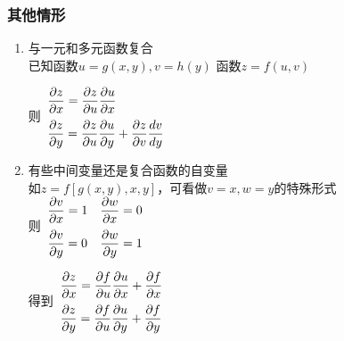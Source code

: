 \documentclass{article} %
\begin{document}
\subsubsection{其他情形}
\begin{enumerate}
    \item 与一元和多元函数复合\\已知函数$u=g(x,y),v=h(y)$ 函数$z=f(u,v)$\par
        \vspace{1mm}

        则$
        \begin{array}{ll}
            \displaystyle \frac{\partial z}{\partial x}=\frac{\partial z}{\partial u}\frac{\partial u}{\partial x} \vspace{2mm}\\
            \displaystyle \frac{\partial z}{\partial y}=\frac{\partial z}{\partial u}\frac{\partial u}{\partial y}+\frac{\partial z}{\partial v}\frac{d v}{d y}
        \end{array}$
    \item 有些中间变量还是复合函数的自变量\\
        如$z=f[g(x,y),x,y]$，可看做$v=x,w=y$的特殊形式\\
        则$\begin{array}{cc}
            \displaystyle\frac{\partial v}{\partial x}=1 & \displaystyle\frac{\partial w}{\partial x}=0 \vspace{2mm}\\
            \displaystyle\frac{\partial v}{\partial y}=0 & \displaystyle\frac{\partial w}{\partial y}=1\\
        \end{array}$\\
        \vspace{2mm}

        得到$\begin{array}{l}
            \displaystyle\frac{\partial z}{\partial x}=\frac{\partial f}{\partial u}\frac{\partial u}{\partial x}+\frac{\partial f}{\partial x}\vspace{2mm}\\
            \displaystyle\frac{\partial z}{\partial y}=\frac{\partial f}{\partial u}\frac{\partial u}{\partial y}+\frac{\partial f}{\partial y}\\
        \end{array}$


\end{enumerate}
\end{document}
